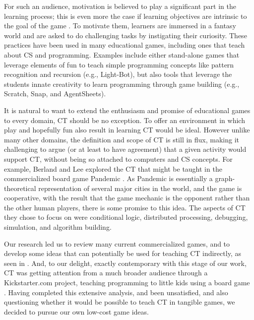 \documentclass{acm_proc_article-sp}
\begin{document}
For such an audience, motivation is believed to play a significant part in the learning process; this is even more the case if learning objectives are intrinsic to the goal of the game \cite{malone1987making}.
To motivate them, learners are immersed in a fantasy world and are asked to do challenging tasks by instigating their curiosity.
These practices have been used in many educational games, including ones that teach about CS and programming.
Examples include either stand-alone games that leverage elements of fun to teach simple programming concepts like pattern recognition and recursion (e.g., Light-Bot), but also tools that leverage the students innate creativity to learn programming through game building (e.g., Scratch, Snap, and AgentSheets).

It is natural to want to extend the enthusiasm and promise of educational games to every domain, CT should be no exception.
To offer an environment in which play and hopefully fun also result in learning CT would be ideal.
However unlike many other domains, the definition and scope of CT is still in flux, making it challenging to argue (or at least to have agreement) that a given activity would support CT, without being so attached to computers and CS concepts.
For example, Berland and Lee explored the CT that might be taught in the commercialized board game Pandemic \cite{berland2011collaborative}.
As Pandemic is essentially a graph-theoretical representation of several major cities in the world, and the game is cooperative, with the result that the game mechanic is the opponent rather than the other human players, there is some promise to this idea.
The aspects of CT they chose to focus on were conditional logic, distributed processing, debugging, simulation, and algorithm building. 

Our research led us to review many current commercialized games, and to develop some ideas that can potentially be used for teaching CT indirectly, as seen in {\em \hyperref[table:games-comparison]{}}.
And, to our delight, exactly contemporary with this stage of our work, CT was getting attention from a much broader audience through a Kickstarter.com project, teaching programming to little kids using a board game \cite{robotturtles}.
Having completed this extensive analysis, and been unsatisfied, and also questioning whether it would be possible to teach CT in tangible games, we decided to pursue our own low-cost game ideas.
\end{document}
